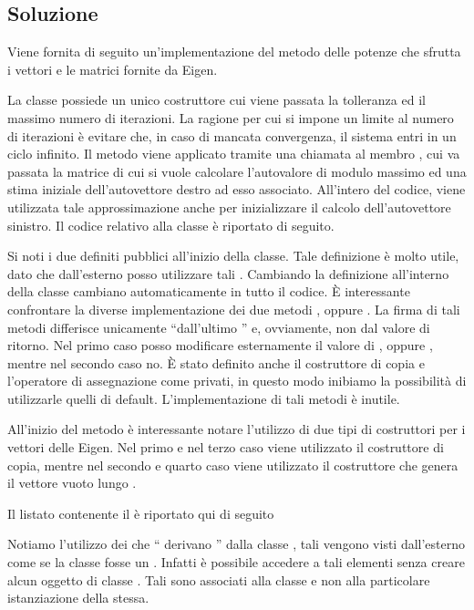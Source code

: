 \subsection*{Soluzione}

Viene fornita di seguito un'implementazione del metodo delle potenze
che sfrutta i vettori e le matrici fornite da Eigen.

La classe  possiede un unico
costruttore cui viene passata la tolleranza ed il massimo numero di
iterazioni. La ragione per cui si impone un limite al numero di
iterazioni \`e evitare che, in caso di mancata convergenza, il sistema
entri in un ciclo infinito. Il metodo viene applicato tramite una
chiamata al membro , cui va passata la matrice di cui si
vuole calcolare l'autovalore di modulo massimo ed una stima iniziale
dell'autovettore destro ad esso associato. All'intero del codice, viene
utilizzata tale approssimazione anche per inizializzare il calcolo
dell'autovettore sinistro. Il codice relativo alla classe 
\`e riportato di seguito.
%
\lstset{basicstyle=\scriptsize\sf}
    
\lstset{basicstyle=\sf}

Si noti i due  definiti pubblici all'inizio della classe.
Tale definizione \`e molto utile, dato che dall'esterno posso utilizzare
tali . Cambiando la definizione all'interno della classe
cambiano automaticamente in tutto il codice. \`E interessante confrontare
la diverse implementazione dei due metodi , oppure .
La firma di tali metodi differisce unicamente ``dall'ultimo '' e,
ovviamente, non dal valore di ritorno. Nel primo caso posso modificare esternamente
il valore di , oppure , mentre nel secondo caso no.
\`E stato definito anche il costruttore di copia e l'operatore di assegnazione
come privati, in questo modo inibiamo la possibilit\`a di utilizzarle quelli
di default. L'implementazione di tali metodi \`e inutile.

\lstset{basicstyle=\scriptsize\sf}
    
\lstset{basicstyle=\sf}

All'inizio del metodo  \`e interessante notare l'utilizzo di due tipi
di costruttori per i vettori delle Eigen. Nel primo e nel terzo caso viene utilizzato
il costruttore di copia, mentre nel secondo e quarto caso viene utilizzato il costruttore
che genera il vettore vuoto lungo .

Il listato contenente il  \`e riportato qui di seguito
\lstset{basicstyle=\scriptsize\sf}
    
\lstset{basicstyle=\sf}

Notiamo l'utilizzo dei  che `` derivano '' dalla classe ,
tali  vengono visti dall'esterno come se la classe  fosse
un . Infatti \`e possibile accedere a tali elementi senza creare alcun
oggetto di classe . Tali  sono associati alla classe e non
alla particolare istanziazione della stessa.
